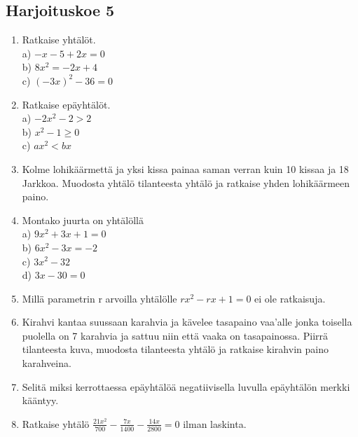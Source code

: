 \subsection*{Harjoituskoe 5}
\begin{enumerate}
\item Ratkaise yhtälöt.\\ a) $-x-5+2x=0$\\ b) $8x^2=-2x+4$\\ c) $(-3x)^2-36=0$
\item Ratkaise epäyhtälöt.\\ a) $-2x^2-2>2$\\ b) $x^2-1\geq0$\\ c) $ax^2<bx$
\item Kolme lohikäärmettä ja yksi kissa painaa saman verran kuin 10 kissaa ja 18 Jarkkoa. Muodosta yhtälö tilanteesta yhtälö ja ratkaise yhden lohikäärmeen paino.
\item Montako juurta on yhtälöllä\\ a) $9x^2+3x+1=0$\\ b) $6x^2-3x=-2$\\ c) $3x^2-32$\\ d) $3x-30=0$
\item Millä parametrin r arvoilla yhtälölle $rx^2-rx+1=0$ ei ole ratkaisuja.
\item Kirahvi kantaa suussaan karahvia ja kävelee tasapaino vaa'alle jonka toisella puolella on 7 karahvia ja sattuu niin että vaaka on tasapainossa. Piirrä tilanteesta kuva, muodosta tilanteesta yhtälö ja ratkaise kirahvin paino karahveina.
\item Selitä miksi kerrottaessa epäyhtälöä negatiivisella luvulla epäyhtälön merkki kääntyy.
\item Ratkaise yhtälö $\frac{21x^2}{700}-\frac{7x}{1400}-\frac{14x}{2800}=0$ ilman laskinta.
\end{enumerate}